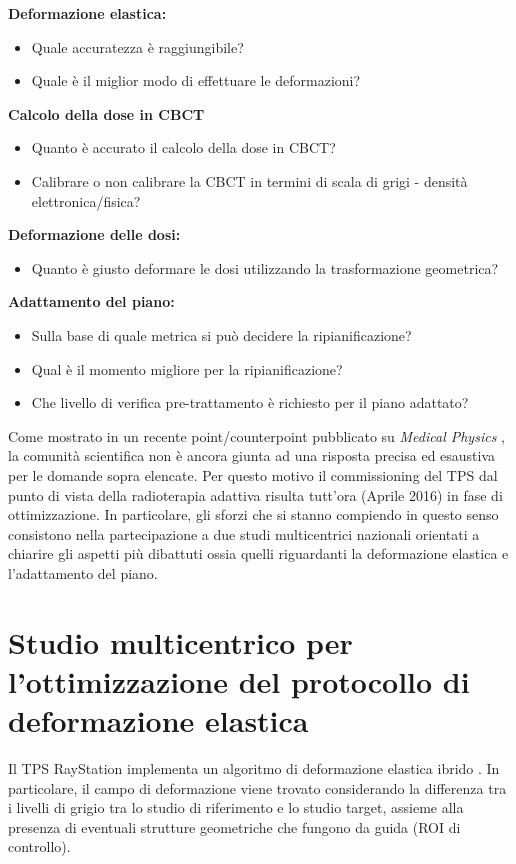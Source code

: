\noindent\textbf{Deformazione elastica:}
\begin{itemize}
\item Quale accuratezza è raggiungibile?
\item Quale è il miglior modo di effettuare le deformazioni?
\end{itemize}
\textbf{Calcolo della dose in CBCT}
\begin{itemize}
\item Quanto è accurato il calcolo della dose in CBCT?
\item Calibrare o non calibrare la CBCT in termini di scala di grigi - densità elettronica/fisica?
\end{itemize}
\textbf{Deformazione delle dosi:}
\begin{itemize}
\item Quanto è giusto deformare le dosi utilizzando la trasformazione geometrica?
\end{itemize}
\textbf{Adattamento del piano:}
\begin{itemize}
\item Sulla base di quale metrica si può decidere la ripianificazione?
\item Qual è il momento migliore per la ripianificazione?
\item Che livello di verifica pre-trattamento è richiesto per il piano adattato?
\end{itemize}

Come mostrato in un recente point/counterpoint pubblicato su \textit{Medical Physics} \cite{Schultheiss2012}, la comunità scientifica non è ancora giunta ad una risposta precisa ed esaustiva per le domande sopra elencate. Per questo motivo il commissioning del TPS dal punto di vista della radioterapia adattiva risulta tutt'ora (Aprile 2016) in fase di ottimizzazione. In particolare, gli sforzi che si stanno compiendo in questo senso consistono nella partecipazione a due studi multicentrici nazionali orientati a chiarire gli aspetti più dibattuti ossia quelli riguardanti la deformazione elastica e l'adattamento del piano.

\section{Studio multicentrico per l'ottimizzazione del protocollo di deformazione elastica}
Il TPS RayStation implementa un algoritmo di deformazione elastica ibrido \cite{RaySearchLaboratories2014}. In particolare, il campo di deformazione viene trovato considerando la differenza tra i livelli di grigio tra lo studio di riferimento e lo studio target, assieme alla presenza di eventuali strutture geometriche che fungono da guida (ROI di controllo).

